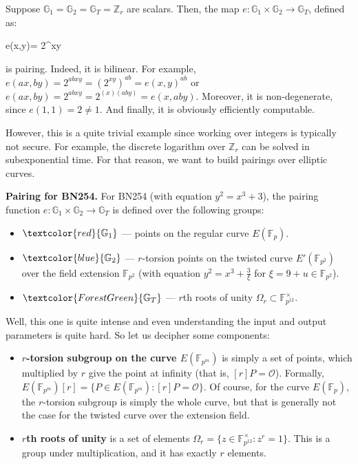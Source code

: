 \documentclass[../../book.tex]{subfiles}
\begin{document}
\begin{example}
    Suppose $\mathbb{G}_1=\mathbb{G}_2=\mathbb{G}_T=\mathbb{Z}_r$ are scalars. Then, the map $e: \mathbb{G}_1 \times \mathbb{G}_2 \to \mathbb{G}_T$, defined as:
    \begin{xequation*}
        e(x,y)= 2^{xy}
    \end{xequation*}
    is pairing. Indeed, it is bilinear. For example, $e(ax,by) = 2^{abxy} = (2^{xy})^{ab} = e(x,y)^{ab}$ or $e(ax,by)=2^{abxy}=2^{(x)(aby)}=e(x,aby)$. Moreover, it is non-degenerate, since $e(1,1)=2 \neq 1$. And finally, it is obviously efficiently computable.

    However, this is a quite trivial example since working over integers is typically not secure. For example, the discrete logarithm over $\mathbb{Z}_r$ can be solved in subexponential time. For that reason, we want to build pairings over elliptic curves.
\end{example}

\begin{example}
    \textbf{Pairing for BN254.} For BN254 (with equation $y^2=x^3+3$), the pairing function $e: \mathbb{G}_1 \times \mathbb{G}_2 \to \mathbb{G}_T$ is defined over the following groups:
    \begin{itemize}
        \item $\textcolor{red}{\mathbb{G}_1}$ --- points on the regular curve $E(\mathbb{F}_p)$.
        \item $\textcolor{blue}{\mathbb{G}_2}$ --- $r$-torsion points on the twisted curve $E'(\mathbb{F}_{p^2})$ over the field extension $\mathbb{F}_{p^2}$ (with equation $y^2 = x^3+\frac{3}{\xi}$ for $\xi=9+u \in \mathbb{F}_{p^2}$).
        \item $\textcolor{ForestGreen}{\mathbb{G}_T}$ --- $r$th roots of unity $\Omega_r \subset \mathbb{F}_{p^{12}}^{\times}$.
    \end{itemize}

    Well, this one is quite intense and even understanding the input and output parameters is quite hard. So let us decipher some components:
    \begin{itemize}
        \item \textbf{$r$-torsion subgroup on the curve $E(\mathbb{F}_{p^m})$} is simply a set of points, which multiplied by $r$ give the point at infinity (that is, $[r]P=\mathcal{O}$). Formally, $E(\mathbb{F}_{p^m})[r] = \{P \in E(\mathbb{F}_{p^m}): [r]P = \mathcal{O}\}$. Of course, for the curve $E(\mathbb{F}_p)$, the $r$-torsion subgroup is simply the whole curve, but that is generally not the case for the twisted curve over the extension field.
        \item \textbf{$r$th roots of unity} is a set of elements $\Omega_r = \{z \in \mathbb{F}_{p^{12}}^{\times}: z^r=1\}$. This is a group under multiplication, and it has exactly $r$ elements.
    \end{itemize}
\end{example}
\end{document}
